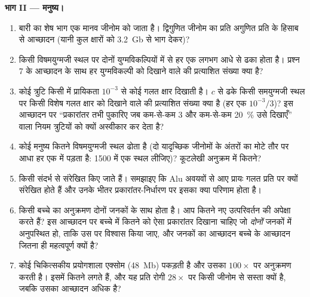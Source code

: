 \begin{problem}
\medskip
\noindent\textbf{भाग II --- मनुष्य।}
\begin{enumerate}[resume]
  \item बारी का शेष भाग एक मानव जीनोम को जाता है। द्विगुणित जीनोम का
        प्रति अगुणित प्रति के हिसाब से आच्छादन (यानी कुल क्षारों को
        \qty{3.2}{Gb} से भाग देकर)?
  \item किसी विषमयुग्मजी स्थल पर दोनों युग्मविकल्पियों में से हर एक
        लगभग आधे  से ढका होता है। प्रश्न 7 के आच्छादन के साथ हर
        युग्मविकल्पी को दिखाने वाले  की प्रत्याशित संख्या क्या है?
  \item कोई त्रुटि किसी  में प्रायिकता $10^{-3}$ से कोई गलत क्षार
        दिखाती है। $c$  से ढके किसी समयुग्मजी स्थल पर किसी विशेष
        गलत क्षार को दिखाने वाले  की प्रत्याशित संख्या क्या है
        (हर एक $10^{-3}/3$)? इस आच्छादन पर ``प्रकारांतर तभी पुकारिए जब
        कम-से-कम $3$  और कम-से-कम \qty{20}{\%}  उसे दिखाएँ''
        वाला नियम त्रुटियों को क्यों अस्वीकार कर देता है?
  \item कोई मनुष्य कितने विषमयुग्मजी स्थल ढोता है (दो यादृच्छिक
        जीनोमों के अंतरों का मोटे तौर पर आधा हर एक में पड़ता है:
        \num{1500} में एक स्थल लीजिए)? कूटलेखी अनुक्रम में कितने?
  \item {} किसी संदर्भ से संरेखित किए जाते हैं। समझाइए कि Alu अवयवों
        से आए  प्रायः गलत प्रति पर क्यों संरेखित होते हैं और उनके
        भीतर प्रकारांतर-निर्धारण पर इसका क्या परिणाम होता है।
  \item किसी बच्चे का अनुक्रमण दोनों जनकों के साथ होता है। आप कितने नए
        उत्परिवर्तन की अपेक्षा करते हैं? इस आच्छादन पर बच्चे में कितने
         को ऐसा प्रकारांतर दिखाना चाहिए जो \emph{दोनों} जनकों में
        अनुपस्थित हो, ताकि उस पर विश्वास किया जाए, और जनकों का आच्छादन
        बच्चे के आच्छादन जितना ही महत्वपूर्ण क्यों है?
  \item कोई चिकित्सकीय प्रयोगशाला एक्सोम (\qty{48}{Mb}) पकड़ती है और
        उसका $100\times$ पर अनुक्रमण करती है। इसमें कितने  लगते
        हैं, और यह प्रति रोगी $28\times$ पर किसी जीनोम से सस्ता क्यों
        है, जबकि उसका आच्छादन अधिक है?
\end{enumerate}


\end{problem}
